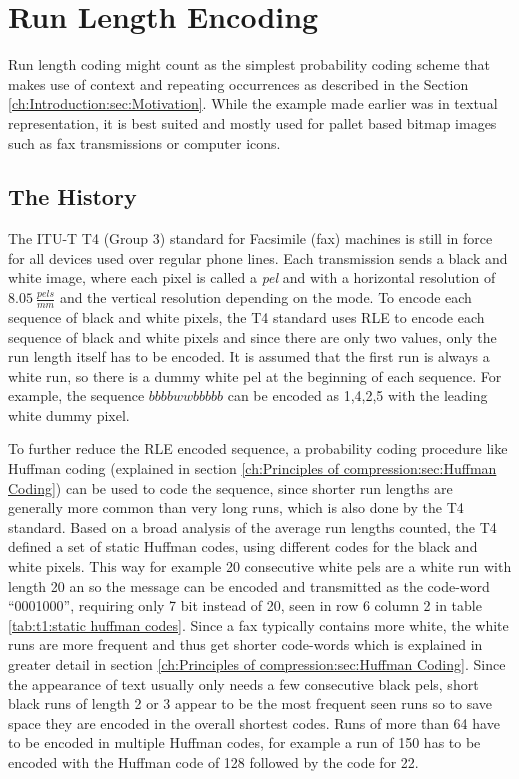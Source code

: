 \section{Run Length Encoding}
\label{ch:Principles of compression:sec:Run Length Encoding}
\par{
	Run length coding might count as the simplest probability coding scheme that makes use of context and repeating occurrences as described in the Section \ref{ch:Introduction:sec:Motivation}. While the example made earlier was in textual representation, it is best suited and mostly used for pallet based bitmap images \cite{palette-image} such as fax transmissions or computer icons.
}

\subsection{The History}
\label{ch:Principles of compression:sec:Run Length Encoding:subSec:History}
\par{
 The ITU-T T4 (Group 3) standard for Facsimile (fax) machines \cite{ITU} is still in force for all devices used over regular phone lines. Each transmission sends a black and white image, where each pixel is called a \textit{pel} and with a horizontal resolution of $8.05 \: \frac{pels}{mm}$ and the vertical resolution depending on the mode. To encode each sequence of black and white pixels, the T4 standard uses RLE to encode each sequence of black and white pixels and since there are only two values, only the run length itself has to be encoded. It is assumed that the first run is always a white run, so there is a dummy white pel at the beginning of each sequence. For example, the sequence $bbbbwwbbbbb$ can be encoded as 1,4,2,5 with the leading white dummy pixel.
}
\par{
To further reduce the RLE encoded sequence, a probability coding procedure like Huffman coding (explained in section \ref{ch:Principles of compression:sec:Huffman Coding}) can be used to code the sequence, since shorter run lengths are generally more common than very long runs, which is also done by the T4 standard. Based on a broad analysis of the average run lengths counted, the T4 defined a set of static Huffman codes, using different codes for the black and white pixels. This way for example 20 consecutive white pels  are a white run with length 20 an so the message can be encoded and transmitted as the code-word \enquote{0001000}, requiring only 7 bit instead of 20, seen in row 6 column 2 in table \ref{tab:t1:static huffman codes}. Since a fax typically contains more white, the white runs are more frequent and thus get shorter code-words which is explained in greater detail in section \ref{ch:Principles of compression:sec:Huffman Coding}. Since the appearance of text usually only needs a few consecutive black pels, short black runs of length 2 or 3 appear to be the most frequent seen runs so to save space they are encoded in the overall shortest codes. Runs of more than 64 have to be encoded in multiple Huffman codes, for example a run of 150 has to be encoded with the Huffman code of 128 followed by the code for 22.
}

